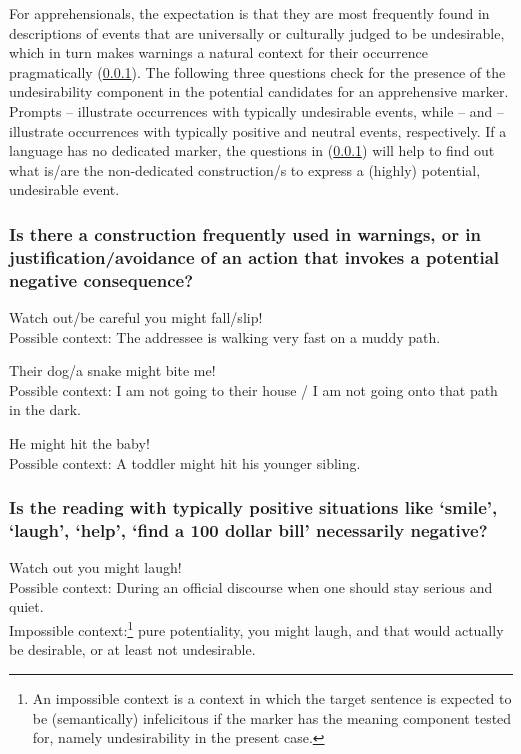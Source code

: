 \documentclass[output=paper,colorlinks,citecolor=brown]{langscibook}
\begin{document}
For apprehensionals, the expectation is that they are most frequently found in descriptions of events that are universally or culturally judged to be undesirable, which in turn makes warnings a natural context for their occurrence pragmatically (\ref{1.1.1}). The following three questions check for the presence of the undesirability component in the potential candidates for an apprehensive marker. Prompts -- illustrate occurrences with typically undesirable events, while -- and -- illustrate occurrences with typically positive and neutral events, respectively. If a language has no dedicated marker, the questions in (\ref{1.1.1}) will help to find out what is/are the non-dedicated construction/s to express a (highly) potential, undesirable event.

\subsubsection{Is there a construction frequently used in warnings, or in justification/avoidance of an action that invokes a potential negative consequence?}
\label{1.1.1}

\ea \label{p1} {\op}Watch out\textnormal{/}be careful{\cp} you might fall\textnormal{/}slip! \\
\textnormal{Possible context: The addressee is walking very fast on a muddy path.}
\z

\ea \label{p2} Their dog\textnormal{/}a snake might bite me!\\
\textnormal{Possible context: I am not going to their house / I am not going onto that path in the dark.}
\z


\ea \label{p3} He might hit the baby! \\
\textnormal{Possible context: A toddler might hit his younger sibling.}
\z

\subsubsection{Is the reading with \textbf{typically positive situations} like `smile', `laugh', `help', `find a 100 dollar bill' necessarily negative?}
\label{1.1.2}

\ea \label{p4} {\op}Watch out{\cp} you might laugh! \\
\textnormal{Possible context: During an official discourse when one should stay serious and quiet.}\\
\textnormal{Impossible context:\footnote{An impossible context is a context in which the target sentence is expected to be (semantically) infelicitous if the marker has the meaning component tested for, namely undesirability in the present case.} pure potentiality, you might laugh, and that would actually be desirable, or at least not undesirable.}
\z
\end{document}
